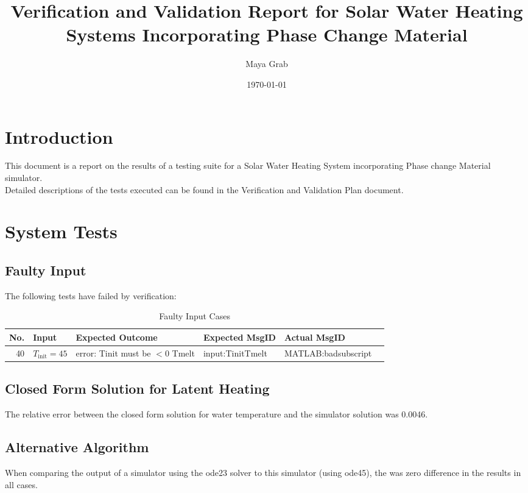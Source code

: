 \documentclass[12pt]{article}
\begin{document}
\title{Verification and Validation Report for Solar Water Heating Systems
  Incorporating Phase Change Material} 
\author{Maya Grab}
\date{\today}
	
\maketitle

\tableofcontents

\section{Introduction}
This document is a report on the results of a testing suite for a Solar Water 
Heating System incorporating Phase change Material simulator.
\\Detailed descriptions of the tests executed can be found in the Verification 
and Validation Plan document.

\section{System Tests}

\subsection{Faulty Input}
The following tests have failed by verification:

\begin{center}
	\begin{longtable}{ | r | p{3cm} | p{4cm} | p{4cm} | p{4cm} | p{4cm}|}
	\caption{Faulty Input Cases} \\ \hline \label{TblInputVar} 
	No. & Input & Expected Outcome & Expected MsgID & Actual MsgID \\ \hline
	40 & $T_{\text{init}} = 45$ &error: Tinit must be $< 0$ Tmelt & input:TinitTmelt & MATLAB:badsubscript \\ \hline
	\end{longtable}
\end{center}

\subsection{Closed Form Solution for Latent Heating}
The relative error between the closed form solution for water temperature and the simulator solution was 0.0046.

\subsection{Alternative Algorithm}
When comparing the output of a simulator using the ode23 solver to this simulator (using ode45), the was zero difference in the results in all cases.
\end{document}
